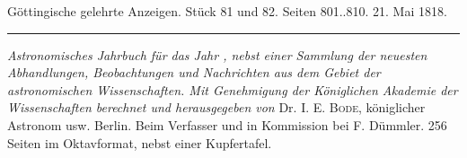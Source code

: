 \clearpage
{}
\hypertarget{native-610-lower}{}
\begin{center}\small Göttingische gelehrte Anzeigen. Stück 81 und 82. Seiten 801..810. 21. Mai 1818.\\[3pt]\rule{.72\linewidth}{.3pt}\end{center}

\emph{Astronomisches Jahrbuch für das Jahr {}, nebst einer Sammlung der neuesten Abhandlungen, Beobachtungen und Nachrichten aus dem Gebiet der astronomischen Wissenschaften. Mit Genehmigung der Königlichen Akademie der Wissenschaften berechnet und herausgegeben von} Dr. I. E. \textsc{Bode}, königlicher Astronom usw. Berlin. Beim Verfasser und in Kommission bei F. Dümmler. 256 Seiten im Oktavformat, nebst einer Kupfertafel.

